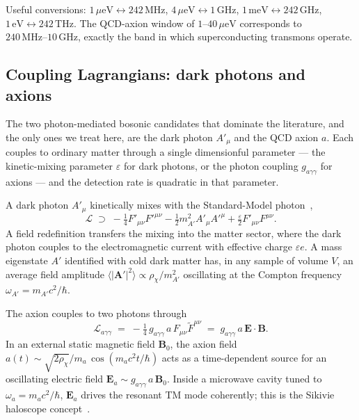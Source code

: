 \begin{example}
\label{ex:freq-mass}
Useful conversions:
$1\,\mu\text{eV}\leftrightarrow 242\,\text{MHz}$,
$4\,\mu\text{eV}\leftrightarrow 1\,\text{GHz}$,
$1\,\text{meV}\leftrightarrow 242\,\text{GHz}$,
$1\,\text{eV}\leftrightarrow 242\,\text{THz}$. The QCD-axion
window of $1\text{--}40\,\mu\text{eV}$ corresponds to
$240\,\text{MHz}\text{--}10\,\text{GHz}$, exactly the band in
which superconducting transmons operate.
\end{example}

\subsection{Coupling Lagrangians: dark photons and axions}
\label{sec:absorption-couplings}

The two photon-mediated bosonic candidates that dominate the
literature, and the only ones we treat here, are the dark photon
$A'_\mu$ and the QCD axion $a$. Each couples to ordinary matter
through a single dimensionful parameter --- the kinetic-mixing
parameter $\varepsilon$ for dark photons, or the photon coupling
$g_{a\gamma\gamma}$ for axions --- and the detection rate is
quadratic in that parameter.

\begin{statement}
\label{stmt:dark-photon}
A dark photon $A'_\mu$ kinetically mixes with the Standard-Model
photon~\cite{holdom1986},
\begin{equation}
\label{eq:dark-photon-L}
\mathcal{L}\;\supset\;-\tfrac{1}{4}F'_{\mu\nu}F'^{\mu\nu}-\tfrac12 m_{A'}^2 A'_\mu A'^\mu
+\tfrac{\varepsilon}{2}F'_{\mu\nu}F^{\mu\nu}.
\end{equation}
A field redefinition transfers the mixing into the matter sector,
where the dark photon couples to the electromagnetic current with
effective charge $\varepsilon e$. A mass eigenstate $A'$ identified
with cold dark matter has, in any sample of volume $V$, an average
field amplitude $\langle |\bm A'|^2\rangle\propto \rho_\chi/m_{A'}^2$
oscillating at the Compton frequency $\omega_{A'}=m_{A'}c^2/\hbar$.
\end{statement}

\begin{statement}
\label{stmt:axion}
The axion couples to two photons through
\begin{equation}
\label{eq:axion-L}
\mathcal{L}_{a\gamma\gamma} \;=\; -\tfrac14\,g_{a\gamma\gamma}\,a\,F_{\mu\nu}\tilde F^{\mu\nu}
\;=\; g_{a\gamma\gamma}\,a\,\bm{E}\!\cdot\!\bm{B}.
\end{equation}
In an external static magnetic field $\bm B_0$, the axion field
$a(t)\sim\sqrt{2\rho_\chi}/m_a\,\cos(m_a c^2 t/\hbar)$ acts as a
time-dependent source for an oscillating electric field
$\bm E_a\sim g_{a\gamma\gamma}\,a\,\bm B_0$. Inside a microwave
cavity tuned to $\omega_a=m_a c^2/\hbar$, $\bm E_a$ drives the
resonant TM mode coherently; this is the Sikivie haloscope
concept~\cite{sikivie1983}.
\end{statement}


